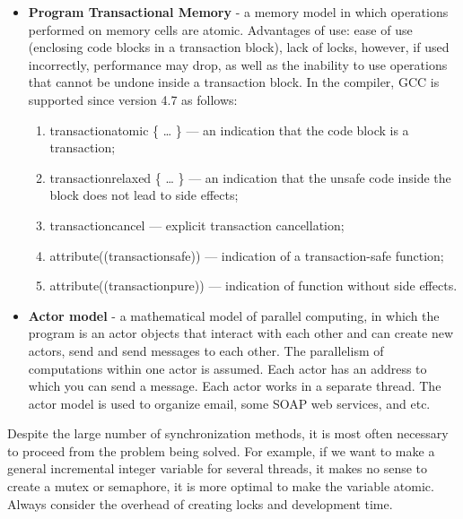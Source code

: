 {		\begin{itemize}
			\item\textbf{Program Transactional Memory} - a memory model in which operations performed on memory cells are atomic. Advantages of use: ease of use (enclosing code blocks in a transaction block), lack of locks, however, if used incorrectly, performance may drop, as well as the inability to use operations that cannot be undone inside a transaction block. In the compiler, GCC is supported since version 4.7 as follows:
				\begin{enumerate}
					\item\textunderscore \textunderscore transaction\textunderscore atomic \{ … \} — an indication that the code block is a transaction;
					\item\textunderscore \textunderscore transaction\textunderscore relaxed \{ … \} — an indication that the unsafe code inside the block does not lead to side effects;
					\item\textunderscore \textunderscore transaction\textunderscore cancel — explicit transaction cancellation;
					\item attribute((transaction\textunderscore safe)) — indication of a transaction-safe function;
					\item attribute((transaction\textunderscore pure)) — indication of function without side effects.
				\end{enumerate}
			\item\textbf{Actor model} - a mathematical model of parallel computing, in which the program is an actor objects that interact with each other and can create new actors, send and send messages to each other. The parallelism of computations within one actor is assumed. Each actor has an address to which you can send a message. Each actor works in a separate thread. The actor model is used to organize email, some SOAP web services, and etc.
		\end{itemize}
	\par Despite the large number of synchronization methods, it is most often necessary to proceed from the problem being solved. For example, if we want to make a general incremental integer variable for several threads, it makes no sense to create a mutex or semaphore, it is more optimal to make the variable atomic. Always consider the overhead of creating locks and development time.
}